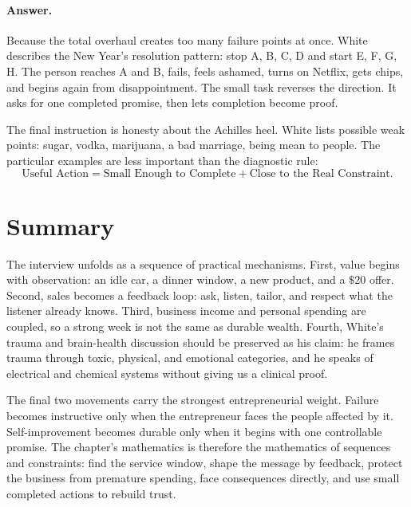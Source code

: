 \paragraph{Answer.}
Because the total overhaul creates too many failure points at once. White describes the New Year's resolution pattern: stop A, B, C, D and start E, F, G, H. The person reaches A and B, fails, feels ashamed, turns on Netflix, gets chips, and begins again from disappointment. The small task reverses the direction. It asks for one completed promise, then lets completion become proof.

The final instruction is honesty about the Achilles heel. White lists possible weak points: sugar, vodka, marijuana, a bad marriage, being mean to people. The particular examples are less important than the diagnostic rule:
\begin{equation}
\text{Useful Action}
=
\text{Small Enough to Complete}
+
\text{Close to the Real Constraint}.
\end{equation}

\section{Summary}

The interview unfolds as a sequence of practical mechanisms. First, value begins with observation: an idle car, a dinner window, a new product, and a \(\$20\) offer. Second, sales becomes a feedback loop: ask, listen, tailor, and respect what the listener already knows. Third, business income and personal spending are coupled, so a strong week is not the same as durable wealth. Fourth, White's trauma and brain-health discussion should be preserved as his claim: he frames trauma through toxic, physical, and emotional categories, and he speaks of electrical and chemical systems without giving us a clinical proof.

The final two movements carry the strongest entrepreneurial weight. Failure becomes instructive only when the entrepreneur faces the people affected by it. Self-improvement becomes durable only when it begins with one controllable promise. The chapter's mathematics is therefore the mathematics of sequences and constraints: find the service window, shape the message by feedback, protect the business from premature spending, face consequences directly, and use small completed actions to rebuild trust.